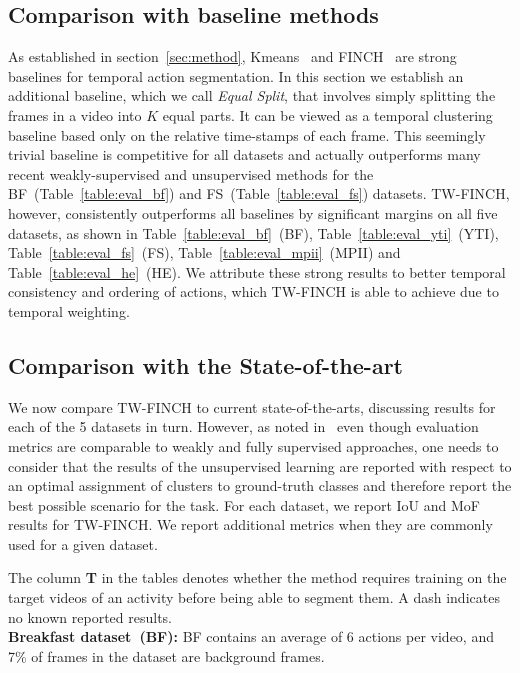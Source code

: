 \documentclass[10pt,twocolumn,letterpaper]{article}
\begin{document}
\subsection{Comparison with baseline methods}
As established in section~\ref{sec:method}, Kmeans~\cite{kmeans} and FINCH~\cite{finch} are strong baselines for temporal action segmentation.
In this section we establish an additional baseline, which we call \textit{Equal Split}, that involves simply splitting the frames in a video into $K$ equal parts.
It can be viewed as a temporal clustering baseline based only on the relative time-stamps of each frame.
This seemingly trivial baseline is competitive for all datasets and actually outperforms many recent weakly-supervised and unsupervised methods for the BF~(Table~\ref{table:eval_bf}) and FS~(Table~\ref{table:eval_fs}) datasets.
TW-FINCH, however, consistently outperforms all baselines by significant margins on all five datasets, as shown in Table~\ref{table:eval_bf}~(BF), Table~\ref{table:eval_yti}~(YTI), Table~\ref{table:eval_fs}~(FS), Table~\ref{table:eval_mpii}~(MPII) and Table~\ref{table:eval_he}~(HE).
We attribute these strong results to better temporal consistency and ordering of actions, which TW-FINCH is able to achieve due to temporal weighting.

\subsection{Comparison with the State-of-the-art} We now compare TW-FINCH
to current state-of-the-arts, discussing results for each of the 5 datasets in turn. However, as noted in~\cite{ute_paper} even though evaluation metrics are comparable to weakly and fully
supervised approaches, one needs to consider that the results of the unsupervised learning are reported with respect
to an optimal assignment of clusters to ground-truth classes
and therefore report the best possible scenario for the task.
For each dataset, we report IoU and MoF results for TW-FINCH. We report additional metrics when they are commonly used for a given dataset.

The column \textbf{T} in the tables denotes whether the method requires training on the target videos of an activity before being able to segment them. A dash indicates no known reported results.\\



\noindent\textbf{Breakfast dataset~(BF):} BF contains an average of 6 actions per video, and 7\% of frames in the dataset are background frames.
\end{document}
